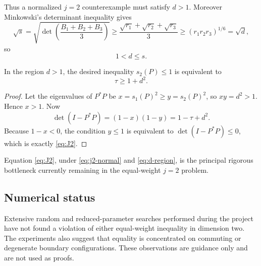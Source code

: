 Thus a normalized $j=2$ counterexample must satisfy $d>1$.  Moreover Minkowski's determinant inequality gives
\[
\sqrt{s}=\sqrt{\det\!\left(\frac{B_1+B_2+B_3}{3}\right)}
\ge \frac{\sqrt{r_1}+\sqrt{r_2}+\sqrt{r_3}}{3}
\ge (r_1r_2r_3)^{1/6}=\sqrt d,
\]
so
\begin{equation}
1<d\le s.
\label{eq:d-region}
\end{equation}

\begin{proposition}[Trace-sign equivalence for the remaining $j=2$ region \statusR]
In the region $d>1$, the desired inequality $s_2(P)\le1$ is equivalent to
\begin{equation}
\boxed{
\tau\ge1+d^2.
}
\label{eq:J2}
\end{equation}
\end{proposition}
\begin{proof}
Let the eigenvalues of $P^*P$ be $x=s_1(P)^2\ge y=s_2(P)^2$, so $xy=d^2>1$.  Hence $x>1$.  Now
\[
\det(I-P^*P)=(1-x)(1-y)=1-\tau+d^2.
\]
Because $1-x<0$, the condition $y\le1$ is equivalent to $\det(I-P^*P)\le0$, which is exactly \eqref{eq:J2}.
\end{proof}

Equation \eqref{eq:J2}, under \eqref{eq:j2-normal} and \eqref{eq:d-region}, is the principal rigorous bottleneck currently remaining in the equal-weight $j=2$ problem.

\subsection{Numerical status}
\statusN{} Extensive random and reduced-parameter searches performed during the project have not found a violation of either equal-weight inequality in dimension two.  The experiments also suggest that equality is concentrated on commuting or degenerate boundary configurations.  These observations are guidance only and are not used as proofs.
